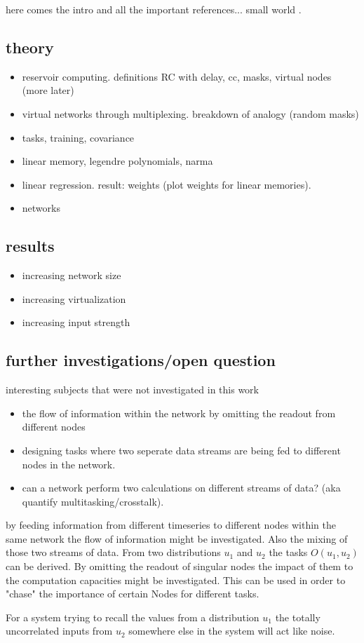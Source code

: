 here comes the intro and all the important references...
small world \cite{WAT98}.

\subsection{theory}
	\begin{itemize}
		\item reservoir computing. definitions RC with delay, cc, masks, virtual nodes (more later)
		\item virtual networks through multiplexing. breakdown of analogy (random masks)
		\item tasks, training, covariance
		\item linear memory, legendre polynomials, narma
		\item linear regression. result: weights (plot weights for linear memories).
		\item networks
	\end{itemize}

\subsection{results}
	\begin{itemize}
		\item increasing network size
		\item increasing virtualization
		\item increasing input strength
	\end{itemize}

\subsection{further investigations/open question}
	interesting subjects that were not investigated in this work
	\begin{itemize}
		\item the flow of information within the network by omitting the readout from different nodes
		\item designing tasks where two seperate data streams are being fed to different nodes in the network.
		\item can a network perform two calculations on different streams of data? (aka quantify multitasking/crosstalk).
	\end{itemize}

by feeding information from different timeseries to different nodes within the same network the flow of information might be investigated. Also the mixing of those two streams of data. From two distributions $u_1$ and $u_2$ the tasks $O(u_1,u_2)$ can be derived. By omitting the readout of singular nodes the impact of them to the computation capacities might be investigated. This can be used in order to "chase" the importance of certain Nodes for different tasks.



For a system trying to recall the values from a distribution $u_1$ the totally uncorrelated inputs from $u_2$ somewhere else in the system will act like noise. 
